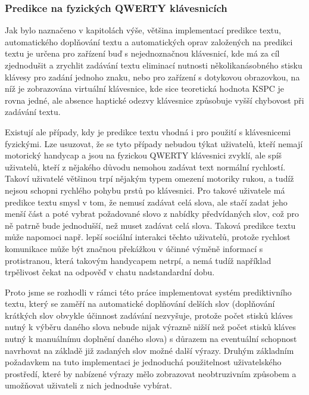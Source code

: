 \documentclass[a4paper,11pt]{article}
\begin{document}
\subsubsection{Predikce na fyzických QWERTY klávesnicích}

Jak bylo naznačeno v kapitolách výše, většina implementací predikce textu, automatického doplňování textu a automatických oprav založených na predikci textu je určena pro zařízení buď s nejednoznačnou klávesnicí, kde má za cíl zjednodušit a zrychlit zadávání textu eliminací nutnosti několikanásobného stisku klávesy pro zadání jednoho znaku, nebo pro zařízení s dotykovou obrazovkou, na níž je zobrazována virtuální klávesnice, kde sice teoretická hodnota KSPC je rovna jedné, ale absence haptické odezvy klávesnice způsobuje vyšší chybovost při zadávání textu. 

Existují ale případy, kdy je predikce textu vhodná i pro použití s klávesnicemi fyzickými. Lze usuzovat, že se tyto případy nebudou týkat uživatelů, kteří nemají motorický handycap a jsou na fyzickou QWERTY klávesnici zvyklí, ale spíš uživatelů, kteří z nějakého důvodu nemohou zadávat text normální rychlostí. Takoví uživatelé většinou trpí nějakým typem omezení motoriky rukou, a tudíž nejsou schopni rychlého pohybu prstů po klávesnici. Pro takové uživatele má predikce textu smysl v tom, že nemusí zadávat celá slova, ale stačí zadat jeho menší část a poté vybrat požadované slovo z nabídky předvídaných slov, což pro ně patrně bude jednodušší, než muset zadávat celá slova. Taková predikce textu může napomoci např. lepší sociální interakci těchto uživatelů, protože rychlost komunikace může být značnou překážkou v účinné výměně informací s protistranou, která takovým handycapem netrpí, a nemá tudíž například trpělivost čekat na odpověď v chatu nadstandardní dobu. %


Proto jsme se rozhodli v rámci této práce implementovat systém prediktivního textu, který se zaměří na automatické doplňování delších slov (doplňování krátkých slov obvykle účinnost zadávání nezvyšuje, protože počet stisků kláves nutný k výběru daného slova nebude nijak výrazně nižší než počet stisků kláves nutný k manuálnímu doplnění daného slova) s důrazem na eventuální schopnost navrhovat na základě již zadaných slov možné další výrazy. Druhým základním požadavkem na tuto implementaci je jednoduchá použitelnost uživatelského prostředí, které by nabízené výrazy mělo zobrazovat neobtruzivním způsobem a umožňovat uživateli z nich jednoduše vybírat.
\end{document}
